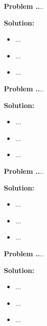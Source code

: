 \documentclass{article}
\theoremstyle{problemstyle}
\newenvironment{boxedproblem}[1]
{\begin{tcolorbox}[colback=white, colframe=black, boxrule=0.5pt]\noindent\textbf{Problem #1.}}
{\end{tcolorbox}}
\begin{document}
    
    \begin{boxedproblem}{32}
    ...
    \end{boxedproblem}
    
    \textbf{Solution:}
    \begin{itemize}[label={},leftmargin=1.25cm,nosep]
        \item ...
        \item ...
        \item ...
    \end{itemize}
    
    
    \begin{boxedproblem}{33}
    ...
    \end{boxedproblem}
    
    \textbf{Solution:}
    \begin{itemize}[label={},leftmargin=1.25cm,nosep]
        \item ...
        \item ...
        \item ...
    \end{itemize}
    
    
    \begin{boxedproblem}{34}
    ...
    \end{boxedproblem}
    
    \textbf{Solution:}
    \begin{itemize}[label={},leftmargin=1.25cm,nosep]
        \item ...
        \item ...
        \item ...
    \end{itemize}
    
    
    \begin{boxedproblem}{35}
    ...
    \end{boxedproblem}
    
    \textbf{Solution:}
    \begin{itemize}[label={},leftmargin=1.25cm,nosep]
        \item ...
        \item ...
        \item ...
    \end{itemize}
    
\end{document}
